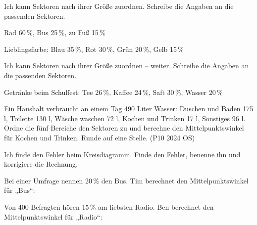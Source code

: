 \begin{aufgabe}{Ich kann Sektoren nach ihrer Größe zuordnen.}
Schreibe die Angaben an die passenden Sektoren.

\noindent\begin{minipage}[t]{0.48\linewidth}
\begin{teile}\teil Rad 60\,\%, Bus 25\,\%, zu Fuß 15\,\%\end{teile}
\end{minipage}\hfill
\begin{minipage}[t]{0.48\linewidth}
\begin{teile}\teil Lieblingsfarbe: Blau 35\,\%, Rot 30\,\%, Grün 20\,\%, Gelb 15\,\%\end{teile}
\end{minipage}
\end{aufgabe}

\begin{aufgabe}{Ich kann Sektoren nach ihrer Größe zuordnen – weiter.}
Schreibe die Angaben an die passenden Sektoren.

\noindent\begin{minipage}[t]{0.40\linewidth}
\begin{teile}\teil Getränke beim Schulfest: Tee 26\,\%, Kaffee 24\,\%, Saft 30\,\%, Wasser 20\,\%\end{teile}
\end{minipage}\hfill
\begin{minipage}[t]{0.56\linewidth}
\begin{teile}\teil Ein Haushalt verbraucht an einem Tag 490 Liter Wasser: Duschen und Baden 175 l, Toilette 130 l, Wäsche waschen 72 l, Kochen und Trinken 17 l, Sonstiges 96 l. Ordne die fünf Bereiche den Sektoren zu und berechne den Mittelpunktswinkel für Kochen und Trinken. Runde auf eine Stelle. (P10 2024 OS)\end{teile}
\end{minipage}
\end{aufgabe}

\begin{aufgabe}{Ich finde den Fehler beim Kreisdiagramm.}
Finde den Fehler, benenne ihn und korrigiere die Rechnung.
\begin{teile}
\teil Bei einer Umfrage nennen 20\,\% den Bus. Tim berechnet den Mittelpunktswinkel für „Bus“:
\par\vspace{16mm}
\teil Von 400 Befragten hören 15\,\% am liebsten Radio. Ben berechnet den Mittelpunktswinkel für „Radio“:
\par\vspace{16mm}
\end{teile}
\end{aufgabe}

